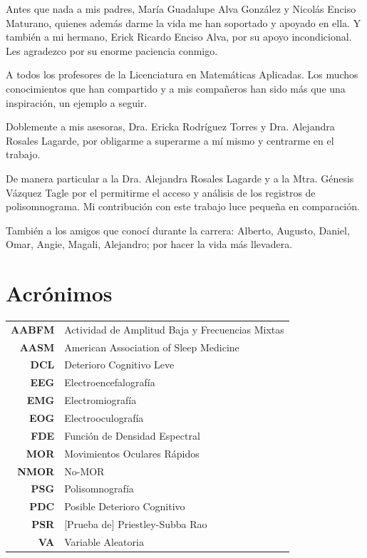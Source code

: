 \documentclass[12pt,letterpaper]{book}
\begin{document}
Antes que nada a mis padres, María Guadalupe Alva González y Nicolás Enciso Maturano, quienes 
además  darme la vida me han soportado y apoyado en ella. Y también a mi hermano, Erick Ricardo 
Enciso Alva, por su apoyo incondicional.
%
Les agradezco por su enorme paciencia conmigo.

A todos los profesores de la Licenciatura en Matemáticas Aplicadas. Los muchos conocimientos que 
han compartido y a mis compañeros han sido más que una inspiración, un ejemplo a seguir.
%

Doblemente a mis asesoras, Dra. Ericka Rodríguez Torres y Dra. Alejandra Rosales Lagarde, por 
obligarme a superarme a mí mismo y centrarme en el trabajo.

De manera particular a la Dra. Alejandra Rosales Lagarde y a la Mtra. Génesis Vázquez Tagle por el 
permitirme el acceso y análisis de los registros de polisomnograma. Mi contribución con este 
trabajo luce pequeña en comparación.

También a los amigos que conocí durante la carrera: Alberto, Augusto, Daniel, Omar, Angie, Magali, 
Alejandro; por hacer la vida más llevadera.


\chapter*{Acrónimos}

\begin{tabular}{rl}
\textbf{AABFM} & Actividad de Amplitud Baja y Frecuencias Mixtas
\\
\textbf{AASM} & American Association of Sleep Medicine
\\
\textbf{DCL} & Deterioro Cognitivo Leve
\\
\textbf{EEG} & Electroencefalografía
\\
\textbf{EMG} & Electromiografía
\\
\textbf{EOG} & Electrooculografía
\\
\textbf{FDE} & Función de Densidad Espectral
\\
\textbf{MOR} & Movimientos Oculares Rápidos
\\
\textbf{NMOR}& No-MOR
\\
\textbf{PSG} & Polisomnografía
\\
\textbf{PDC} & Posible Deterioro Cognitivo
\\
\textbf{PSR} & [Prueba de] Priestley-Subba Rao
\\
\textbf{VA} & Variable Aleatoria
\\
\end{tabular}
\end{document}
